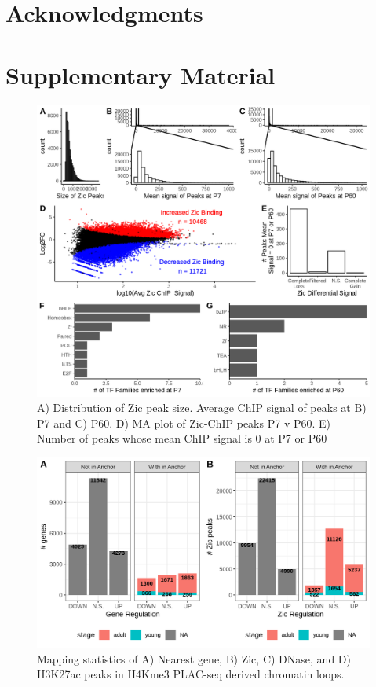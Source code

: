 \documentclass[fleqn,10pt,twocolumn]{wlscirep}
\begin{document}
\section*{Acknowledgments}





\clearpage


\beginsupplement
\section*{Supplementary Material}

\begin{figure}[ht]
\centering
\includegraphics[width=.90\linewidth]{Figures/supp_figure1.png}
\caption{A) Distribution of Zic peak size. Average ChIP signal of peaks at B) P7 and C) P60. D) MA plot of Zic-ChIP peaks P7 v P60. E) Number of peaks whose mean ChIP signal is 0 at P7 or P60}
\label{fig:ZicStats}
\end{figure}


\begin{figure}[ht]
\centering
\includegraphics[width=.90\linewidth]{Figures/supp_figure2.png}
\caption{Mapping statistics of A) Nearest gene, B) Zic, C) DNase, and D) H3K27ac peaks in H4Kme3 PLAC-seq derived chromatin loops.}
\label{fig:MappingStats}
\end{figure}
\end{document}
